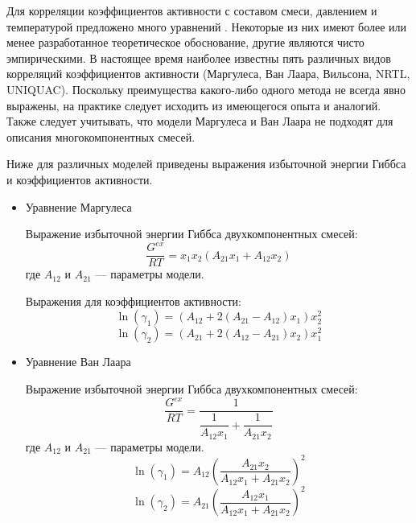 Для корреляции коэффициентов активности с составом смеси, давлением и температурой предложено много уравнений \cite{rid1982,yelles1989}. Некоторые из них имеют более или менее разработанное теоретическое обоснование, другие являются чисто эмпирическими. В настоящее время наиболее известны пять различных видов корреляций коэффициентов активности (Маргулеса, Ван Лаара, Вильсона, NRTL, UNIQUAC). Поскольку преимущества какого-либо одного метода не всегда явно выражены, на практике следует исходить из имеющегося опыта и аналогий. Также следует учитывать, что модели Маргулеса и Ван Лаара не подходят для описания многокомпонентных смесей.

Ниже для различных моделей приведены выражения избыточной энергии Гиббса и коэффициентов активности.
\begin{itemize}
	\item Уравнение Маргулеса
	
	Выражение избыточной энергии Гиббса двухкомпонентных смесей:
	\begin{equation}\label{eq.phase.gemarg}
	\frac{G^{ex}}{RT}=x_1 x_2 (A_{21} x_1+ A_{12} x_2)
	\end{equation}
	где $A_{12}$ и $A_{21}$ --- параметры модели.
	
	Выражения для коэффициентов активности:
	\begin{equation} \label{eq.phase.ga1marg}
	\ln(\gamma_1)=(A_{12}+2(A_{21}-A_{12})x_1)x_2^2
	\end{equation}
	\begin{equation} \label{eq.phase.ga2marg}
	\ln(\gamma_2)=(A_{21}+2(A_{12}-A_{21})x_2)x_1^2
	\end{equation}
	
	\item Уравнение Ван Лаара
	
	Выражение избыточной энергии Гиббса двухкомпонентных смесей:
	\begin{equation}\label{eq.phase.gewlar}
	\frac{G^{ex}}{RT}=\dfrac{1}{\dfrac{1}{A_{12} x_1}+ \dfrac{1}{A_{21}x_2}}
	\end{equation}
	где $A_{12}$ и $A_{21}$ --- параметры модели.
	\begin{equation}
	\ln(\gamma_1)=A_{12}\left( \dfrac{A_{21}x_2}{A_{12}x_1 + A_{21} x_2}\right)^2
	\end{equation}
	\begin{equation}
	\ln(\gamma_2)=A_{21}\left( \dfrac{A_{12}x_1}{A_{12}x_1 + A_{21} x_2}\right)^2
	\end{equation}
	

\end{itemize}
